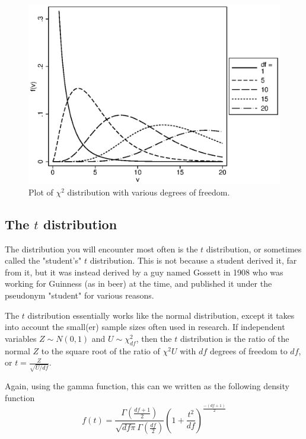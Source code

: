 \begin{figure}
   \centering
   \includegraphics[angle=0,
           width=.75\textwidth]{chi.eps}
   \caption{Plot of $\chi^2$ distribution with various degrees of freedom.}
  \label{fig:chi}
\end{figure}

\subsection{The $t$ distribution}

The distribution you will encounter most often is the $t$ distribution, or sometimes called the "student's" $t$ distribution. This is not because a student derived it, far from it, but it was instead derived by a guy named Gossett in 1908 who was working for Guinness (as in beer) at the time, and published it under the pseudonym "student" for various reasons.

The $t$ distribution essentially works like the normal distribution, except it takes into account the small(er) sample sizes often used in research. If independent variables $Z \sim N\left(0,1\right)$ and $U \sim \chi_{df}^2$, then the $t$ distribution is the ratio of the normal $Z$ to the square root of the ratio of $\chi^2 U$ with $df$ degrees of freedom to $df$, or $t = \frac{Z}{\sqrt{U/df}}$.

Again, using the gamma function, this can we written as the following density function
\begin{equation}
f(t) = \frac{\Gamma\left(\frac{df+1}{2}\right)}{\sqrt{df\pi}\Gamma\left(\frac{df}{2}\right)}\left(1+\frac{t^2}{df}\right)^{\frac{-\left(df+1\right)}{2}}
\end{equation}

